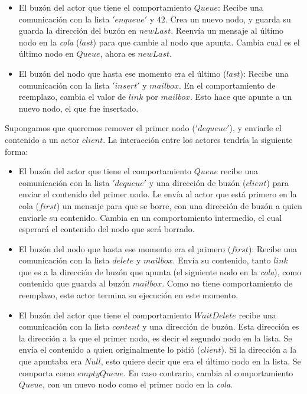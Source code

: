 \begin{itemize}
 \item El buzón del actor que tiene el comportamiento $Queue$:
 \subitem Recibe una comunicación con la lista $'enqueue'$ y $42$.
 \subitem Crea un nuevo nodo, y guarda su guarda la dirección del buzón en $newLast$.
 \subitem Reenvía un mensaje al último nodo en la \textit{cola} ($last$) para que cambie al nodo que apunta.
 \subitem Cambia cual es el último nodo en $Queue$, ahora es $newLast$.
 \item El buzón del nodo que hasta ese momento era el último ($last$):
 \subitem Recibe una comunicación con la lista $'insert'$ y $mailbox$.
 \subitem En el comportamiento de reemplazo, cambia el valor de $link$ por $mailbox$. Esto hace que apunte a un nuevo nodo, el que fue insertado.
\end{itemize}

Supongamos que queremos remover el primer nodo ($'dequeue'$), y enviarle el contenido a un actor $client$. La interacción entre los actores tendría la siguiente forma:

\begin{itemize}
 \item El buzón del actor que tiene el comportamiento $Queue$ recibe una comunicación con la lista $'dequeue'$ y una dirección de buzón ($client$) para enviar el contenido del primer nodo.
 \subitem Le envía al actor que está primero en la cola ($first$) un mensaje para que se borre, con una dirección de buzón a quien enviarle su contenido.
 \subitem Cambia en un comportamiento intermedio, el cual esperará el contenido del nodo que será borrado.
 \item El buzón del nodo que hasta ese momento era el primero ($first$):
 \subitem Recibe una comunicación con la lista $delete$ y $mailbox$.
 \subitem Envía su contenido, tanto $link$ que es a la dirección de buzón que apunta (el siguiente nodo en la \textit{cola}), como contenido que guarda al buzón $mailbox$. Como no tiene comportamiento de reemplazo, este actor termina su ejecución en este momento.
 \item El buzón del actor que tiene el comportamiento $WaitDelete$ recibe una comunicación con la lista $content$ y una dirección de buzón. Esta dirección es la dirección a la que el primer nodo, es decir el segundo nodo en la lista.
 \subitem Se envía el contenido a quien originalmente lo pidió ($client$).
 \subitem Si la dirección a la que apuntaba era $Null$, esto quiere decir que era el último nodo en la lista. Se comporta como $emptyQueue$.
 \subitem En caso contrario, cambia al comportamiento $Queue$, con un nuevo nodo como el primer nodo en la \textit{cola}.
\end{itemize}

